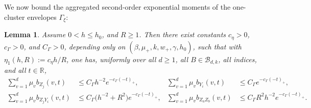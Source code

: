 \documentclass{article}
\newtheorem{lemma}{Lemma}[section]
\newcommand{\R}{\mathbb{R}}
\begin{document}
We now bound the aggregated second-order exponential moments of the one-cluster envelopes $\Gamma_{\xi}$:
\begin{lemma}
\label{lem:envelope-b-profile}
Assume $0<h\le h_0$, and $R\ge 1$. Then there exist constants $c_\eta>0$, $c_\Gamma>0$, and $C_\Gamma>0$, depending only on $(\beta,\mu_+,k,w_+,\gamma,h_0)$, such that with $\eta_1(h,R):=c_\eta h/R$, 
one has, uniformly over all $d\ge 1$, all $B\in\mathcal B_{d,k}$, all indices, and all $t\in\R$,
\begin{align}
\sum_{v=1}^d \mu_v b_{Z_j}(v,t) &\le C_\Gamma h^{-2} e^{-c_\Gamma(-t)_+}, & \sum_{v=1}^d \mu_v b_{Y_i}(v,t)  &\le  C_\Gamma e^{-c_\Gamma(-t)_+}, \label{eq:b-profile-Z-Y-main} \\
\sum_{v=1}^d \mu_v b_{Z_jY_i}(v,t) &\le C_\Gamma \bigl(h^{-2}+R^2\bigr)e^{-c_\Gamma(-t)_+}, & \sum_{v=1}^d \mu_v b_{Z_aZ_b}(v,t) &\le C_\Gamma R^2 h^{-2} e^{-c_\Gamma(-t)_+}. \label{eq:b-profile-ZY-ZZ-main}
\end{align}
\end{lemma}
\end{document}
